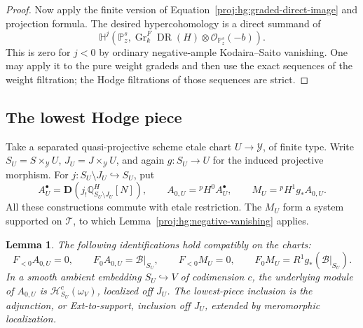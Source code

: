 \documentclass[11pt,letterpaper]{article}
\newtheorem{lemma}[theorem]{Lemma}
\theoremstyle{definition}
\theoremstyle{remark}
\begin{document}
\begin{proof}
Now apply the finite version of
Equation~\eqref{proj:hg:graded-direct-image} and projection formula.
The desired hypercohomology is a direct summand of
\[
 \mathbb H^j\!\left(
   \mathbb{P}^s_z,\operatorname{Gr}^F_k\operatorname{DR}(H)\otimes\mathcal{O}_{\mathbb{P}^s_z}(-b)
 \right).
\]
This is zero for \(j<0\) by ordinary negative-ample
Kodaira--Saito vanishing.  One may apply it to the pure weight
gradeds and then use the exact sequences of the weight filtration;
the Hodge filtrations of those sequences are strict.
\end{proof}

\subsection{The lowest Hodge piece}

Take a separated quasi-projective scheme etale chart
\(U\to\mathcal Y\), of finite type.  Write
\(S_U=S\times_{\mathcal Y}U\), \(J_U=J\times_{\mathcal Y}U\),
and again \(g:S_U\to U\) for the induced projective morphism.
For \(j:S_U\setminus J_U\hookrightarrow S_U\), put
\[
 A^\bullet_U=\mathbf D\!\left(
             j_!\mathbb{Q}^H_{S_U\setminus J_U}[N]\right),
 \qquad
 A_{0,U}={}^{p}\!H^0A^\bullet_U,
 \qquad
 M_U={}^{p}\!H^1g_*A_{0,U}.
\]
All these constructions commute with etale restriction.  The \(M_U\)
form a system supported on \(\mathcal T\), to which
Lemma~\ref{proj:hg:negative-vanishing} applies.

\begin{lemma}\label{proj:hg:lowest-piece}
The following identifications hold compatibly on the charts:
\[
 F_{<0}A_{0,U}=0,\qquad F_0A_{0,U}=\mathcal B|_{S_U},
 \qquad
 F_{<0}M_U=0,\qquad
 F_0M_U=R^1g_*(\mathcal B|_{S_U}).
\]
In a smooth ambient embedding \(S_U\hookrightarrow V\) of
codimension \(c\), the underlying module of \(A_{0,U}\) is
\(\mathcal H^c_{S_U}(\omega_V)\), localized off \(J_U\).
The lowest-piece inclusion is the adjunction, or Ext-to-support,
inclusion off \(J_U\), extended by meromorphic localization.
\end{lemma}
\end{document}
